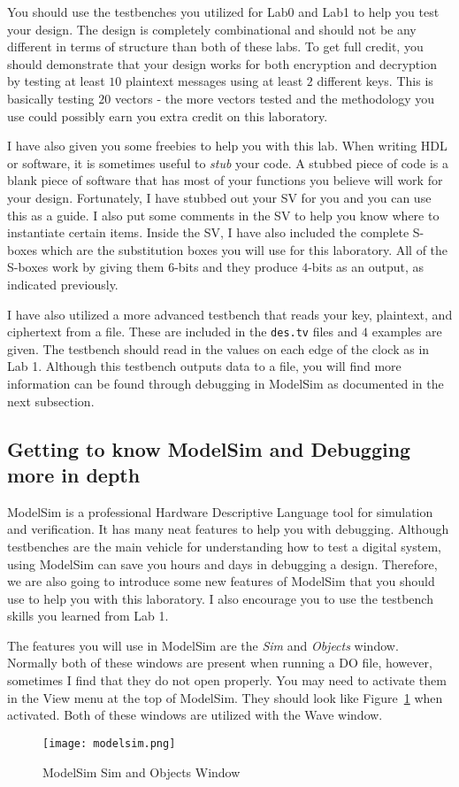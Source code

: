 \documentclass{article}
\begin{document}
You should use the testbenches you utilized for Lab0 and Lab1 to help
you test your design.  The design is completely combinational and
should not be any different in terms of structure than both of these
labs.  To get full credit, you should demonstrate that your design
works for both encryption and decryption by testing at least $10$
plaintext messages using at least $2$ different keys.  This is
basically testing $20$ vectors - the more vectors tested and the
methodology you use could possibly
earn you extra credit on this laboratory.

I have also given you some freebies to help you with this lab.  When
writing HDL or software, it is sometimes useful to \textit{stub} your
code.  A stubbed piece of code is a blank piece of software that has
most of your functions you believe will work for your design.
Fortunately, I have stubbed out your SV for you and you can use this
as a guide.  I also put some comments in the SV to help you know where
to instantiate certain items.
Inside the SV, I have also included the complete S-boxes
which are the substitution boxes you will use for
this laboratory.  All of the S-boxes work by giving them $6$-bits and
they produce $4$-bits as an output, as indicated previously.

I have also utilized a more advanced testbench that reads your
key, plaintext, and ciphertext from a file.  These are included in the
\verb!des.tv! files and $4$ examples are given.  The testbench should
read in the values on each edge of the clock as in Lab 1.  Although
this testbench outputs data to a file, you will find more information
can be found through debugging in ModelSim as documented in the next
subsection.

\subsection{Getting to know ModelSim and Debugging more in depth}

ModelSim is a professional Hardware Descriptive Language tool for
simulation and verification.  It has many neat features to help you
with debugging.  Although testbenches are the main vehicle for
understanding how to test a digital system, using ModelSim can save
you hours and days in debugging a design.  Therefore, we are also
going to introduce some new features of ModelSim that you should use
to help you with this laboratory. I also encourage you to use the
testbench skills you learned from Lab 1.

The features you will use in ModelSim are the \textit{Sim} and
\textit{Objects} window.  Normally both of these windows are present
when running a DO file, however, sometimes I find that they do not
open properly.  You may need to activate them in the View menu at the
top of ModelSim.  They should look like Figure~\ref{modelsim.png} when
activated.  Both of these windows are utilized with the Wave window.
\begin{figure} [t!]
  \centering
  \texttt{[image: modelsim.png]}
  \caption{ModelSim Sim and Objects Window}
  \label{modelsim.png}
\end{figure}
\end{document}
